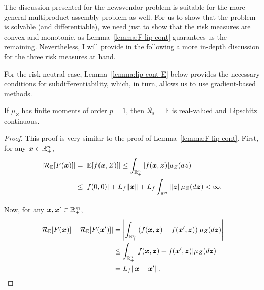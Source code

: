 \documentclass[12pt]{article}
\begin{document}
The discussion presented for the newsvendor problem is suitable for the more general multiproduct assembly problem as well.
For us to show that the problem is solvable (and differentiable), we need just to show that the risk measures are convex and monotonic, as Lemma~\ref{lemma:F-lip-cont} guarantees us the remaining.
Nevertheless, I will provide in the following a more in-depth discussion for the three risk measures at hand.


For the risk-neutral case, Lemma~\ref{lemma:lip-cont-E} below provides the necessary conditions for subdifferentiability, which, in turn, allows us to use gradient-based methods.

\begin{lemma}\label{lemma:lip-cont-E}
    If $\mu_Z$ has finite moments of order $p=1$, then $\mathcal{R}_{\mathbb{E}} = \mathbb{E}$ is real-valued and Lipschitz continuous.
\end{lemma}
\begin{proof}
    This proof is very similar to the proof of Lemma~\ref{lemma:F-lip-cont}.
    First, for any $\bm{x}\in \mathbb{R}^{n}_+$,
    \begin{align*}
	|\mathcal{R}_{\mathbb{E}}[F(\bm{x})]| &= |\mathbb{E}[f(\bm{x},Z)]| \le \int_{\mathbb{R}^{n}_+} |f(\bm{x},\bm{z})| \mu_Z(d\bm{z}) \\
	&\le |f(0,0)| + L_f \| \bm{x} \| + L_f \int_{\mathbb{R}^{n}_+} \|\bm{z}\| \mu_Z(d\bm{z}) < \infty
    .\end{align*}

    Now, for any $\bm{x},\bm{x}'\in \mathbb{R}^{m}_+$,
    \begin{align*}
	|\mathcal{R}_\mathbb{E}[F(\bm{x})] - \mathcal{R}_\mathbb{E}[F(\bm{x}')]| &= \left| \int_{\mathbb{R}^{n}_+} \left( f(\bm{x},\bm{z}) - f(\bm{x}',\bm{z}) \right) \mu_Z(d\bm{z}) \right|  \\
	&\le \int_{\mathbb{R}^{n}_+} |f(\bm{x},\bm{z}) - f(\bm{x}',\bm{z})| \mu_Z(d\bm{z}) \\
	&= L_f \|\bm{x} - \bm{x}'\|
    .\end{align*}
\end{proof}
\end{document}
